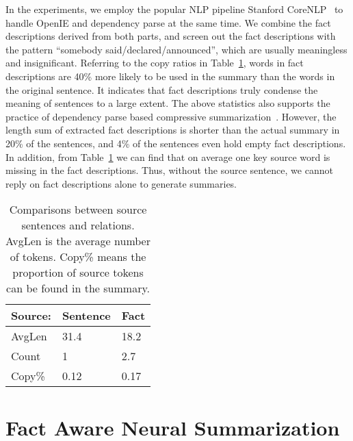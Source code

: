 \documentclass[letterpaper]{article} \usepackage{aaai18}  \usepackage{times}  \usepackage{helvet}  \usepackage{courier}  \usepackage{url}  \usepackage{graphicx}  \usepackage{amsfonts}
\begin{document}
	In the experiments, we employ the popular NLP pipeline Stanford CoreNLP~\cite{manning-EtAl:2014:P14-5} to handle OpenIE and dependency parse at the same time. 
	We combine the fact descriptions derived from both parts, and screen out the fact descriptions with the pattern ``somebody said/declared/announced'', which are usually meaningless and insignificant.
	Referring to the copy ratios in Table~\ref{tb:relation_info}, words in fact descriptions are 40\% more likely to be used in the summary than the words in the original sentence.
	It indicates that fact descriptions truly condense the meaning of sentences to a large extent.
	The above statistics also supports the practice of dependency parse based compressive summarization~\cite{knight2002summarization}.
	However, the length sum of extracted fact descriptions is shorter than the actual summary in 20\% of the sentences, and 4\% of the sentences even hold empty fact descriptions.
	In addition, from Table~\ref{tb:relation_info} we can find that on average one key source word is missing in the fact descriptions.
	Thus, without the source sentence, we cannot reply on fact descriptions alone to generate summaries. 
	
	\begin{table}[ht]
		\centering
		\begin{tabular}{l|ll}
			\hline
			Source:  & Sentence & Fact \\ \hline
			AvgLen   & 31.4     & 18.2      \\
			Count & 1        & 2.7       \\
			Copy\%  & 0.12      & 0.17         \\ \hline
		\end{tabular}
		\caption{Comparisons between source sentences and relations. AvgLen is the average number of tokens. Copy\% means the proportion of source tokens can be found in the summary.}
		\label{tb:relation_info}
	\end{table}
	
	\section{Fact Aware Neural Summarization}
\end{document}
